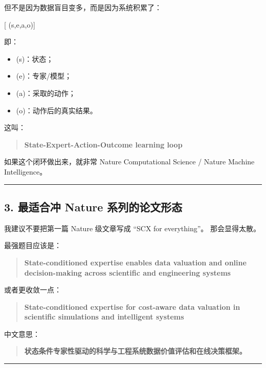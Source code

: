\documentclass[
  12pt,
]{ctexart}
\providecommand{\tightlist}{%
  \setlength{\itemsep}{0pt}\setlength{\parskip}{0pt}}
\begin{document}
但不是因为数据盲目变多，而是因为系统积累了：

{[} (s,e,a,o){]}

即：

\begin{itemize}
\tightlist
\item
  (s)：状态；
\item
  (e)：专家/模型；
\item
  (a)：采取的动作；
\item
  (o)：动作后的真实结果。
\end{itemize}

这叫：

\begin{quote}
\textbf{State-Expert-Action-Outcome learning loop}
\end{quote}

如果这个闭环做出来，就非常 Nature Computational Science / Nature Machine
Intelligence。

\begin{center}\rule{0.5\linewidth}{0.5pt}\end{center}

\subsection{3. 最适合冲 Nature
系列的论文形态}\label{ux6700ux9002ux5408ux51b2-nature-ux7cfbux5217ux7684ux8bbaux6587ux5f62ux6001}

我建议不要把第一篇 Nature 级文章写成 ``SCX for everything''。
那会显得太散。

最强题目应该是：

\begin{quote}
\textbf{State-conditioned expertise enables data valuation and online
decision-making across scientific and engineering systems}
\end{quote}

或者更收敛一点：

\begin{quote}
\textbf{State-conditioned expertise for cost-aware data valuation in
scientific simulations and intelligent systems}
\end{quote}

中文意思：

\begin{quote}
\textbf{状态条件专家性驱动的科学与工程系统数据价值评估和在线决策框架。}
\end{quote}

\begin{center}\rule{0.5\linewidth}{0.5pt}\end{center}
\end{document}
